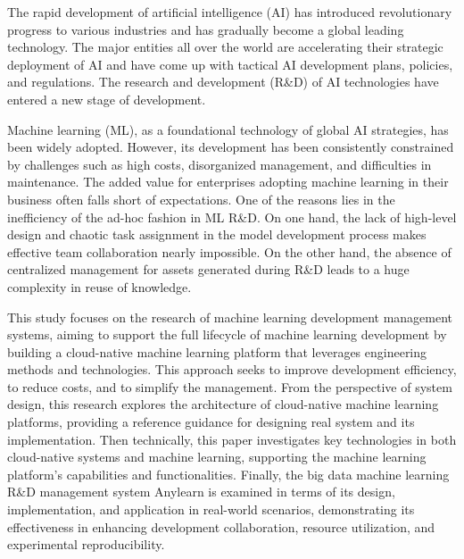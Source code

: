 \begin{abstract*}
  The rapid development of artificial intelligence (AI) has introduced revolutionary progress to various industries and has gradually become a global leading technology.
  The major entities all over the world are accelerating their strategic deployment of AI and have come up with tactical AI development plans, policies, and regulations.
  The research and development (R\&D) of AI technologies have entered a new stage of development.
  
  Machine learning (ML), as a foundational technology of global AI strategies, has been widely adopted.
  However, its development has been consistently constrained by challenges such as high costs, disorganized management, and difficulties in maintenance.
  The added value for enterprises adopting machine learning in their business often falls short of expectations.
  One of the reasons lies in the inefficiency of the ad-hoc fashion in ML R\&D.
  On one hand, the lack of high-level design and chaotic task assignment in the model development process makes effective team collaboration nearly impossible.
  On the other hand, the absence of centralized management for assets generated during R\&D leads to a huge complexity in reuse of knowledge.
  
  This study focuses on the research of machine learning development management systems, aiming to support the full lifecycle of machine learning development by building a cloud-native machine learning platform that leverages engineering methods and technologies.
  This approach seeks to improve development efficiency, to reduce costs, and to simplify the management.
  From the perspective of system design, this research explores the architecture of cloud-native machine learning platforms, providing a reference guidance for designing real system and its implementation.
  Then technically, this paper investigates key technologies in both cloud-native systems and machine learning, supporting the machine learning platform's capabilities and functionalities.
  Finally, the big data machine learning R\&D management system Anylearn is examined in terms of its design, implementation, and application in real-world scenarios, demonstrating its effectiveness in enhancing development collaboration, resource utilization, and experimental reproducibility.

\end{abstract*}
